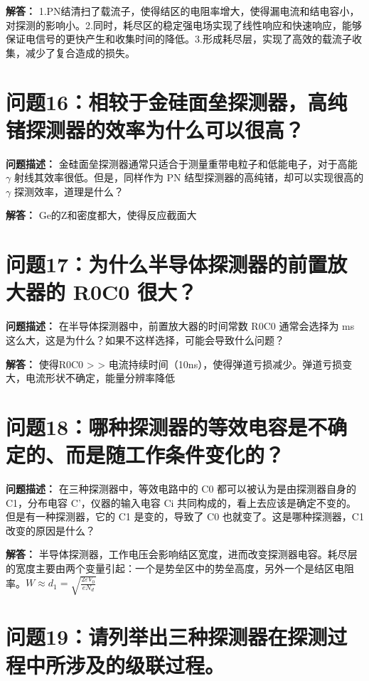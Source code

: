 \documentclass{article}
\begin{document}
\textbf{解答：} 1.PN结清扫了载流子，使得结区的电阻率增大，使得漏电流和结电容小，对探测的影响小。2.同时，耗尽区的稳定强电场实现了线性响应和快速响应，能够保证电信号的更快产生和收集时间的降低。3.形成耗尽层，实现了高效的载流子收集，减少了复合造成的损失。

\section{问题16：相较于金硅面垒探测器，高纯锗探测器的效率为什么可以很高？}
\label{sec:prob16}

\textbf{问题描述：} 金硅面垒探测器通常只适合于测量重带电粒子和低能电子，对于高能 $\gamma$ 射线其效率很低。但是，同样作为 PN 结型探测器的高纯锗，却可以实现很高的 $\gamma$ 探测效率，道理是什么？

\textbf{解答：} Ge的Z和密度都大，使得反应截面大

\section{问题17：为什么半导体探测器的前置放大器的 R0C0 很大？}
\label{sec:prob17}

\textbf{问题描述：} 在半导体探测器中，前置放大器的时间常数 R0C0 通常会选择为 ms 这么大，这是为什么？如果不这样选择，可能会导致什么问题？

\textbf{解答：} 使得R0C0 > > 电流持续时间（10ns），使得弹道亏损减少。弹道亏损变大，电流形状不确定，能量分辨率降低

\section{问题18：哪种探测器的等效电容是不确定的、而是随工作条件变化的？}
\label{sec:prob18}

\textbf{问题描述：} 在三种探测器中，等效电路中的 C0 都可以被认为是由探测器自身的 C1，分布电容 C'，仪器的输入电容 Ci 共同构成的，看上去应该是确定不变的。但是有一种探测器，它的 C1 是变的，导致了 C0 也就变了。这是哪种探测器，C1 改变的原因是什么？

\textbf{解答：} 半导体探测器，工作电压会影响结区宽度，进而改变探测器电容。耗尽层的宽度主要由两个变量引起：一个是势垒区中的势垒高度，另外一个是结区电阻率。$W\approx d_1=\sqrt{\frac{2\varepsilon V_0}{e N_d}}$

\section{问题19：请列举出三种探测器在探测过程中所涉及的级联过程。}
\label{sec:prob19}
\end{document}
